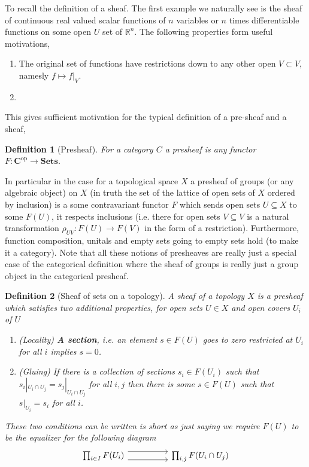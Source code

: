 \documentclass[12pt]{article}
\numberwithin{equation}{section}
\newcommand{\R}{\mathbb{R}}
\newtheorem{definition}{Definition}[section]
\begin{document}
\begin{appendices}
\begin{enumerate}
		To recall the definition of a sheaf. The first example we naturally see is the sheaf of continuous real valued scalar functions of $n$ variables or $n$ times differentiable functions on some open $ U$ set of $\R^n$. The following properties form useful motivations,
		\begin{enumerate}
			\item The original set of functions have restrictions down to any other open $V \subset V$, namesly $f \mapsto f|_V$.
			\item 
		\end{enumerate}
		This gives sufficient motivation for the typical definition of a pre-sheaf and a sheaf,
		\begin{definition}[Presheaf]
			For a category $C$ a presheaf is any functor $F: \mathbf{C}^{\mathrm{op}}\to \mathbf{Sets}$.
		\end{definition}
		In particular in the case for a topological space $X$ a presheaf of groups (or any algebraic object) on $X$ (in truth the set of the lattice of open sets of $X$ ordered by inclusion) is a some contravariant functor $F$ which sends open sets $U \subseteq X$ to some $F(U)$, it respects inclusions (i.e. there for open sets $V \subseteq V $ is a natural transformation $\rho_{UV}: F(U)\to F(V)$ in the form of a restriction). Furthermore, function composition, unitals and empty sets going to empty sets hold (to make it a category). Note that all these notions of presheaves are really just a special case of the categorical definition where the sheaf of groups is really just a group object in the categorical presheaf.
		\begin{definition}[Sheaf of sets on a topology]
			A sheaf of a topology $X$ is a presheaf which satisfies two additional properties, for open sets $U \in X$ and open covers ${U_i}$ of $U$
			\begin{enumerate}
				\item (Locality)  \textbf{A section}, i.e. an element $s \in F(U)$ goes to zero restricted at $U_i$ for all $i$ implies $s=0$.
				\item (Gluing) If there is a collection of sections $s_i \in F(U_i)$ such that $s_i|_{U_i \cap U_j}=s_j|_{U_i \cap U_j}$ for all $i,j$ then there is some $s \in F(U)$ such that $s|_{U_i}=s_i$ for all $i$.
			\end{enumerate}
			
			These two conditions can be written is short as just saying we require $F(U)$ to be the equalizer for the following diagram
			\[\begin{tikzcd}
				{\prod_{i \in I} F(U_i)} && {\prod_{i,j}F(U_i \cap U_j)}
				\arrow[shift right=2, from=1-1, to=1-3]
				\arrow[shift left=2, from=1-1, to=1-3]
			\end{tikzcd}\]
		\end{definition}
		

\end{enumerate}
\end{appendices}
\end{document}
